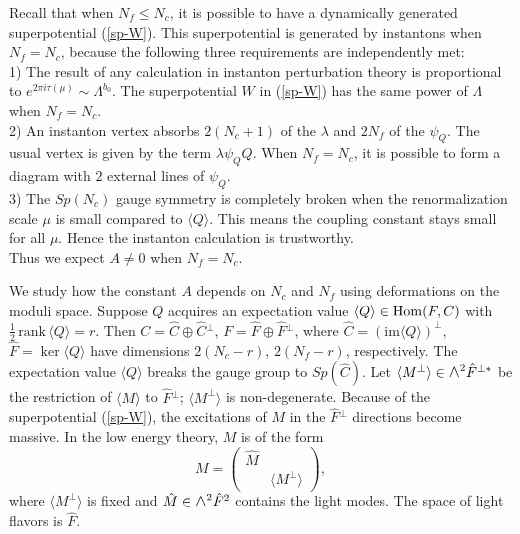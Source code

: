 \documentclass[lecture]{qft-l}
\newcommand{\lam}{\lambda}
\newcommand{\Lam}{\varLambda}
\newcommand{\medwedge}{\mbox{\fontsize{12pt}{0pt}\selectfont $\wedge$}}
\newcommand{\Hom}{{\rm Hom}}
\newcommand{\bra}{\langle}
\newcommand{\ket}{\rangle}
\newcommand{\inv}[1]{\frac{1}{#1}}
\newcommand{\hf}{{\textstyle \inv{2}}}
\newcommand{\e}[1]{e^{{#1}}}
\newcommand{\ii}{i}
\newcommand{\rank}{\mathrm{\,rank\,}}
\newcommand{\im}{\mathrm{im}}
\newcommand{\hC}{\hat{C}{}}
\newcommand{\hF}{\hat{F}{}}
\newcommand{\hM}{\hat{M}{}}
\newcommand{\Mperp}{\bra M^\perp\ket}
\newcommand{\four}[4]{\left(	\begin{array}{cc}
				{#1}	&	{#2}	\\
				{#3}	&	{#4}
				\end{array}   \right)}
\begin{document}
Recall that when $N_f\le N_c$, it is possible to have a dynamically
generated superpotential (\ref{sp-W}).
This superpotential is generated by instantons when $N_f=N_c$,
because the following three requirements are independently met:\\
1) The result of any calculation in instanton perturbation theory is 
proportional to $\e{2\pi\ii\tau(\mu)}\sim\Lam^{b_0}$.
The superpotential $W$ in (\ref{sp-W}) has the same power of $\Lam$ 
when $N_f=N_c$.\\
2) An instanton vertex absorbs $2(N_c+1)$ of the $\lam$ and $2N_f$ of
the $\psi_Q$.
The usual vertex is given by the term $\lam\psi_QQ$.
When $N_f=N_c$, it is possible to form a diagram with $2$ external
lines of $\psi_Q$.\\
3) The $Sp(N_c)$ gauge symmetry is completely broken when the 
renormalization scale $\mu$ is small compared to $\bra Q\ket$.
This means the coupling constant stays small for all $\mu$.
Hence the instanton calculation is trustworthy.\\
Thus we expect $A\ne0$ when $N_f=N_c$.

We study how the constant $A$ depends on $N_c$ and $N_f$
using deformations on the moduli space.
Suppose $Q$ acquires an expectation value $\bra Q\ket\in\Hom(F,C)$
with $\hf\rank\bra Q\ket=r$.
Then $C=\hC\oplus\hC^\perp$, $F=\hF\oplus\hF^\perp$,
where $\hC=(\im\bra Q\ket)^\perp$, $\hF=\ker\bra Q\ket$
have dimensions $2(N_c-r)$, $2(N_f-r)$, respectively.
The expectation value $\bra Q\ket$ breaks the gauge group to $Sp(\hC)$.
Let $\Mperp\in\medwedge^2\hF^{\perp *}$ be the restriction
of $\bra M\ket$ to $\hF^\perp$; $\Mperp$ is non-degenerate.
Because of the superpotential (\ref{sp-W}), the excitations of $M$ in
the $\hF^\perp$ directions become massive.
In the low energy theory, $M$ is of the form
	\begin{equation}\label{sp-M}
M=\four{\hM}{}{}{\Mperp},
	\end{equation}
where $\Mperp$ is fixed and $\hM\in\medwedge^2\hF^2$ contains 
the light modes.
The space of light flavors is $\hF$.
\end{document}
